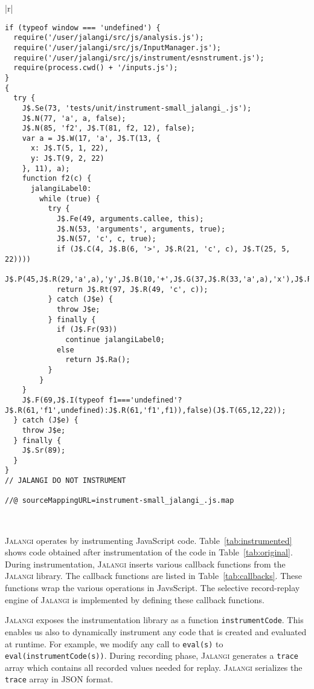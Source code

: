 \documentclass{sig-alternate}
\def\jalangi{\textsc{Jalangi}}
\begin{document}
\begin{table*}
\begin{tabular}{|r|}
\hline\\
{\scriptsize
\begin{lstlisting}
if (typeof window === 'undefined') {
  require('/user/jalangi/src/js/analysis.js');
  require('/user/jalangi/src/js/InputManager.js');
  require('/user/jalangi/src/js/instrument/esnstrument.js');
  require(process.cwd() + '/inputs.js');
}
{
  try {
    J$.Se(73, 'tests/unit/instrument-small_jalangi_.js');
    J$.N(77, 'a', a, false);
    J$.N(85, 'f2', J$.T(81, f2, 12), false);
    var a = J$.W(17, 'a', J$.T(13, {
      x: J$.T(5, 1, 22),
      y: J$.T(9, 2, 22)
    }, 11), a);
    function f2(c) {
      jalangiLabel0:
        while (true) {
          try {
            J$.Fe(49, arguments.callee, this);
            J$.N(53, 'arguments', arguments, true);
            J$.N(57, 'c', c, true);
            if (J$.C(4, J$.B(6, '>', J$.R(21, 'c', c), J$.T(25, 5, 22))))
              J$.P(45,J$.R(29,'a',a),'y',J$.B(10,'+',J$.G(37,J$.R(33,'a',a),'x'),J$.R(41,'c',c)));
            return J$.Rt(97, J$.R(49, 'c', c));
          } catch (J$e) {
            throw J$e;
          } finally {
            if (J$.Fr(93))
              continue jalangiLabel0;
            else
              return J$.Ra();
          }
        }
    }
    J$.F(69,J$.I(typeof f1==='undefined'?J$.R(61,'f1',undefined):J$.R(61,'f1',f1)),false)(J$.T(65,12,22));
  } catch (J$e) {
    throw J$e;
  } finally {
    J$.Sr(89);
  }
}
// JALANGI DO NOT INSTRUMENT

//@ sourceMappingURL=instrument-small_jalangi_.js.map
\end{lstlisting}
}\\
\hline
\end{tabular}
\caption{After Instrumentation of  Code in Table~\ref{tab:original}}
\label{tab:instrumented}
\end{table*}

\jalangi{} operates by instrumenting JavaScript code.
Table~\ref{tab:instrumented} shows code obtained after instrumentation
of the code in Table~\ref{tab:original}.  During instrumentation,
\jalangi{} inserts various callback functions from the \jalangi{}
library.  The callback functions are listed in
Table~\ref{tab:callbacks}.  These functions wrap the various
operations in JavsScript.  The selective record-replay engine of
\jalangi{} is implemented by defining these callback functions.

\jalangi{} exposes the instrumentation library as a function
\texttt{instrumentCode}.  This enables us also to dynamically
instrument any code that is created and evaluated at runtime.  For
example, we modify any call to \texttt{eval(s)} to
\texttt{eval(instrumentCode(s))}.
During recording phase, \jalangi{} generates a \texttt{trace} array
which contains all recorded values needed for replay.  \jalangi{}
serializes the \texttt{trace} array in JSON format.  
\end{document}
